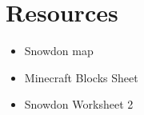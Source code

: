 \documentclass{geocraft-lesson-plan}
\begin{document}

\section*{Resources}
\begin{itemize}
\item Snowdon map 
\item Minecraft Blocks Sheet
\item Snowdon Worksheet 2
\end{itemize}

\end{document}
